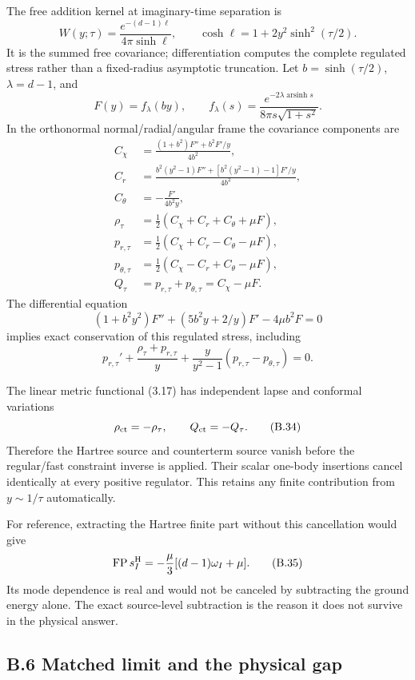 \documentclass[a4paper,11pt]{article}
\numberwithin{equation}{section}
\begin{document}
The free addition kernel at imaginary-time separation is \[
W(y;\tau)=\frac{e^{-(d-1)\ell}}{4\pi\sinh\ell},\qquad
\cosh\ell=1+2y^2\sinh^2(\tau/2).
\tag{B.32}
\] It is the summed free covariance; differentiation computes the complete regulated stress rather than a fixed-radius asymptotic truncation. Let \(b=\sinh(\tau/2)\), \(\lambda=d-1\), and \[
F(y)=f_\lambda(by),\qquad
f_\lambda(s)=
\frac{e^{-2\lambda\operatorname{arsinh}s}}
{8\pi s\sqrt{1+s^2}}.
\] In the orthonormal normal/radial/angular frame the covariance components are \[
\begin{aligned}
C_\chi&=\frac{(1+b^2)F''+b^2F'/y}{4b^2},\\
C_r&=\frac{b^2(y^2-1)F''+[b^2(y^2-1)-1]F'/y}{4b^2},\\
C_\theta&=-\frac{F'}{4b^2y},\\
\rho_\tau&=\tfrac12(C_\chi+C_r+C_\theta+\mu F),\\
p_{r,\tau}&=\tfrac12(C_\chi+C_r-C_\theta-\mu F),\\
p_{\theta,\tau}&=\tfrac12(C_\chi-C_r+C_\theta-\mu F),\\
Q_\tau&=p_{r,\tau}+p_{\theta,\tau}=C_\chi-\mu F .
\end{aligned}
\tag{B.33}
\] The differential equation \[
(1+b^2y^2)F''+(5b^2y+2/y)F'-4\mu b^2F=0
\] implies exact conservation of this regulated stress, including \[
p_{r,\tau}'+\frac{\rho_\tau+p_{r,\tau}}y
+\frac{y}{y^2-1}(p_{r,\tau}-p_{\theta,\tau})=0.
\]

The linear metric functional (3.17) has independent lapse and conformal variations \[
\rho_{\rm ct}=-\rho_\tau,\qquad Q_{\rm ct}=-Q_\tau .
\tag{B.34}
\] Therefore the Hartree source and counterterm source vanish before the regular/fast constraint inverse is applied. Their scalar one-body insertions cancel identically at every positive regulator. This retains any finite contribution from \(y\sim1/\tau\) automatically.

For reference, extracting the Hartree finite part without this cancellation would give \[
\operatorname{FP}s_I^{\rm H}
=-\frac{\mu}{3}[(d-1)\omega_I+\mu] .
\tag{B.35}
\] Its mode dependence is real and would not be canceled by subtracting the ground energy alone. The exact source-level subtraction is the reason it does not survive in the physical answer.

\hypertarget{b.6-matched-limit-and-the-physical-gap}{%
\subsection{B.6 Matched limit and the physical gap}\label{b.6-matched-limit-and-the-physical-gap}}
\end{document}
